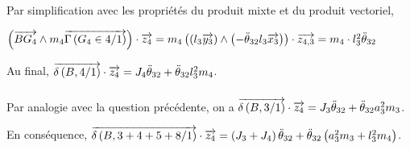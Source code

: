 \documentclass[10pt,fleqn]{article} %
\begin{document}
Par simplification avec les propriétés du produit mixte et du produit vectoriel,

$
\left(\overrightarrow{BG_4}\wedge m_4 \overrightarrow{\Gamma \left( {G_4} \in {4}/{1}\right)}\right)\cdot\overrightarrow{z_4} =
m_4\left( \left(l_3 \overrightarrow{y_3} \right) \wedge  \left(-\ddot{\theta}_{32}l_3\overrightarrow{x_3} \right) \right)\cdot \overrightarrow{z_{4,3}}
=m_4\cdot l_3^2\ddot{\theta}_{32}
$

  Au final,  $\overrightarrow{\delta \left( {B}, {4} /{1}\right)}\cdot\overrightarrow{z_4} = J_4 \ddot{\theta}_{32}+\ddot{\theta}_{32}l_3^2 m_4 $.


%
%
%  
%  
%
  



\subparagraph{}%
Par analogie avec la question précédente, on a $\overrightarrow{\delta \left( {B}, {3} /{1}\right)}\cdot\overrightarrow{z_4}= J_3\ddot{\theta}_{32}+\ddot{\theta}_{32}a_3^2 m_3$.

En conséquence,  $\overrightarrow{\delta \left( {B}, {3+4+5+8} /{1}\right)}\cdot\overrightarrow{z_4} = \left(J_3+J_4\right) \ddot{\theta}_{32}+\ddot{\theta}_{32}\left( a_3^2 m_3  +l_3^2 m_4  \right)$.
\end{document}

